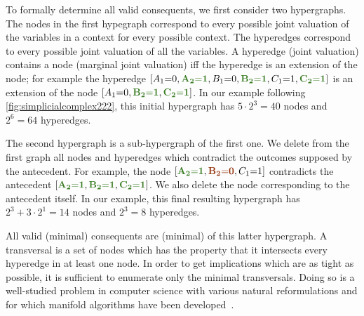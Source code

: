 To formally determine all valid consequents, we first consider two hypergraphs. %
The nodes in the first hypegraph correspond to every possible joint valuation of the variables in a context for every possible context.
The hyperedges correspond to every possible joint valuation of all the variables. A hyperedge (joint valuation) contains a node (marginal joint valuation) iff the hyperedge is an extension of the node; for example the hyperedge $\bracks{A_1 \eql 0, \mgreen{A_2 \eql 1}, B_1 \eql 0, \mgreen{B_2 \eql 1}, C_1 \eql 1, \mgreen{C_2 \eql 1}}$ is an extension of the node $\bracks{A_1 \eql 0,  \mgreen{B_2 \eql 1}, \mgreen{C_2 \eql 1}}$. In our example following \cref{fig:simplicialcomplex222}, this initial hypergraph has $5\cdot 2^3 = 40$ nodes and $2^6 = 64$ hyperedges.

The second hypergraph is a sub-hypergraph of the first one. We delete from the first graph all nodes and hyperedges which contradict the outcomes supposed by the antecedent. For example, the node $\bracks{\mgreen{A_2 \eql 1}, \mred{B_2 \eql 0}, C_1 \eql 1}$ contradicts the antecedent $\bracks{\mgreen{A_2 \eql 1}, \mgreen{B_2 \eql 1}, \mgreen{C_2 \eql 1}}$. We also delete the node corresponding to the antecedent itself. In our example, this final resulting hypergraph has $2^3 + 3\cdot 2^1 = 14$ nodes and $2^3 = 8$ hyperedges.

All valid (minimal) consequents are (minimal)  of this latter hypergraph. A transversal is a set of nodes which has the property that it intersects every hyperedge in at least one node. In order to get implications which are as tight as possible, it is sufficient to enumerate only the minimal transversals. Doing so is a well-studied problem in computer science with various natural reformulations and for which manifold algorithms have been developed~\cite{eiter_dualization_2008}.


